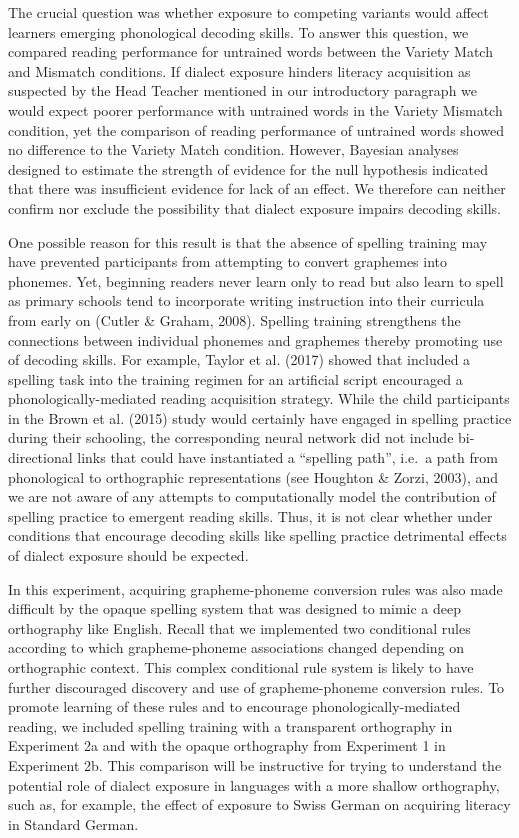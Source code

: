 \documentclass[doc,floatsintext]{apa6}
\begin{document}
The crucial question was whether exposure to competing variants would
affect learners emerging phonological decoding skills. To answer this
question, we compared reading performance for untrained words between
the Variety Match and Mismatch conditions. If dialect exposure hinders
literacy acquisition as suspected by the Head Teacher mentioned in our
introductory paragraph we would expect poorer performance with untrained
words in the Variety Mismatch condition, yet the comparison of reading
performance of untrained words showed no difference to the Variety Match
condition. However, Bayesian analyses designed to estimate the strength
of evidence for the null hypothesis indicated that there was
insufficient evidence for lack of an effect. We therefore can neither
confirm nor exclude the possibility that dialect exposure impairs
decoding skills.

One possible reason for this result is that the absence of spelling
training may have prevented participants from attempting to convert
graphemes into phonemes. Yet, beginning readers never learn only to read
but also learn to spell as primary schools tend to incorporate writing
instruction into their curricula from early on (Cutler \& Graham, 2008).
Spelling training strengthens the connections between individual
phonemes and graphemes thereby promoting use of decoding skills. For
example, Taylor et al. (2017) showed that included a spelling task into
the training regimen for an artificial script encouraged a
phonologically-mediated reading acquisition strategy. While the child
participants in the Brown et al. (2015) study would certainly have
engaged in spelling practice during their schooling, the corresponding
neural network did not include bi-directional links that could have
instantiated a \enquote{spelling path}, i.e.~a path from phonological to
orthographic representations (see Houghton \& Zorzi, 2003), and we are
not aware of any attempts to computationally model the contribution of
spelling practice to emergent reading skills. Thus, it is not clear
whether under conditions that encourage decoding skills like spelling
practice detrimental effects of dialect exposure should be expected.

In this experiment, acquiring grapheme-phoneme conversion rules was also
made difficult by the opaque spelling system that was designed to mimic
a deep orthography like English. Recall that we implemented two
conditional rules according to which grapheme-phoneme associations
changed depending on orthographic context. This complex conditional rule
system is likely to have further discouraged discovery and use of
grapheme-phoneme conversion rules. To promote learning of these rules
and to encourage phonologically-mediated reading, we included spelling
training with a transparent orthography in Experiment 2a and with the
opaque orthography from Experiment 1 in Experiment 2b. This comparison
will be instructive for trying to understand the potential role of
dialect exposure in languages with a more shallow orthography, such as,
for example, the effect of exposure to Swiss German on acquiring
literacy in Standard German.
\end{document}

